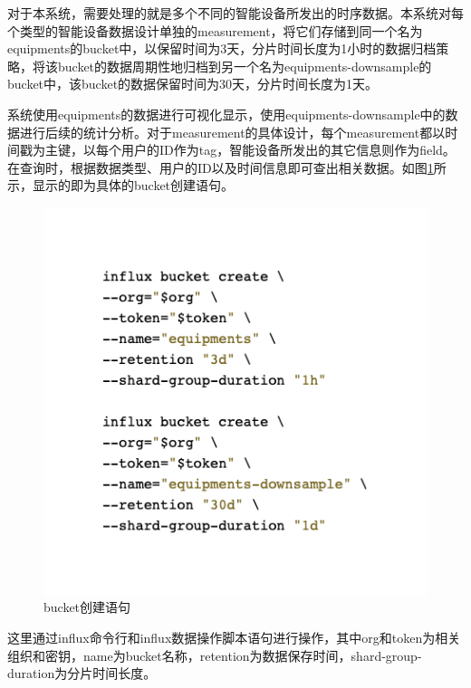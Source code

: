 \documentclass[oneside]{xduugthesis}
\begin{document}
对于本系统，需要处理的就是多个不同的智能设备所发出的时序数据。本系统对每个类型的智能设备数据设计单独的measurement，将它们存储到同一个名为equipments的bucket中，以保留时间为3天，分片时间长度为1小时的数据归档策略，将该bucket的数据周期性地归档到另一个名为equipments-downsample的bucket中，该bucket的数据保留时间为30天，分片时间长度为1天。

系统使用equipments的数据进行可视化显示，使用equipments-downsample中的数据进行后续的统计分析。对于measurement的具体设计，每个measurement都以时间戳为主键，以每个用户的ID作为tag，智能设备所发出的其它信息则作为field。在查询时，根据数据类型、用户的ID以及时间信息即可查出相关数据。如图\ref{fig:bucket}所示，显示的即为具体的bucket创建语句。

\begin{figure}[htb]
    \centering
    \includegraphics[width=0.8\linewidth]{images/code-bucket.jpeg}
    \caption{bucket创建语句}
    \label{fig:bucket}
\end{figure}



这里通过influx命令行和influx数据操作脚本语句进行操作，其中org和token为相关组织和密钥，name为bucket名称，retention为数据保存时间，shard-group-duration为分片时间长度。
\end{document}

